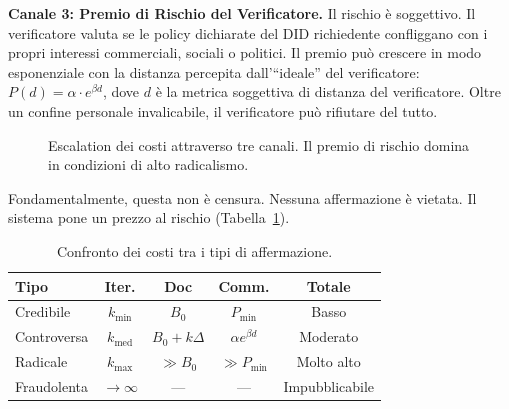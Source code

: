 \documentclass[11pt,a4paper,twocolumn]{article}
\begin{document}
\textbf{Canale 3: Premio di Rischio del Verificatore.} Il rischio è soggettivo. Il verificatore valuta se le policy dichiarate del DID richiedente confliggano con i propri interessi commerciali, sociali o politici. Il premio può crescere in modo esponenziale con la distanza percepita dall'``ideale'' del verificatore: $P(d) = \alpha \cdot e^{\beta d}$, dove $d$ è la metrica soggettiva di distanza del verificatore. Oltre un confine personale invalicabile, il verificatore può rifiutare del tutto.

\begin{figure}[ht]
\centering
{}
\caption{Escalation dei costi attraverso tre canali. Il premio di rischio domina in condizioni di alto radicalismo.}
\label{fig:radicalism}
\end{figure}

Fondamentalmente, questa non è censura. Nessuna affermazione è vietata. Il sistema pone un prezzo al rischio (Tabella~\ref{tab:costs}).

\begin{table}[ht]
\centering
\caption{Confronto dei costi tra i tipi di affermazione.}
\label{tab:costs}
\footnotesize
\begin{tabular}{@{}lcccc@{}}
\toprule
\textbf{Tipo} & \textbf{Iter.} & \textbf{Doc} & \textbf{Comm.} & \textbf{Totale} \\
\midrule
Credibile & $k_{\min}$ & $B_0$ & $P_{\min}$ & Basso \\
Controversa & $k_{\text{med}}$ & $B_0{+}k\Delta$ & $\alpha e^{\beta d}$ & Moderato \\
Radicale & $k_{\max}$ & $\gg B_0$ & $\gg P_{\min}$ & Molto alto \\
Fraudolenta & $\to\infty$ & --- & --- & Impubblicabile \\
\bottomrule
\end{tabular}
\end{table}
\end{document}
